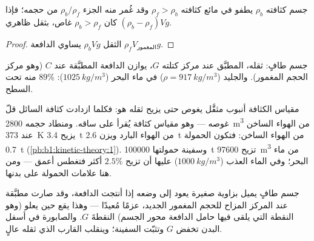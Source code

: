 \begin{corollary}[الطفو]\label{cor:b1:fluid-statics:floating}
جسم كثافته $\rho_b$ يطفو في مائع كثافته $\rho_f > \rho_b$ وقد غُمر
منه الجزء $\rho_b/\rho_f$ من حجمه؛ فإذا كان $\rho_b >
\rho_f$ غاص، بثقل ظاهري $(\rho_b - \rho_f)Vg$.
\end{corollary}

\begin{proof}
الثقل $\rho_bVg$ يساوي الدافعة $\rho_fV_{\text{المغمور}}g$.
\end{proof}

\begin{omfigure}

{\small جسم طافٍ: ثقله، المطبَّق عند مركز كتلته $G$، يوازن
الدافعة المطبَّقة عند  $C$ (وهو مركز الحجم
المغمور). والجليد ($\rho = \qty{917}{kg/m^3}$) في ماء البحر
($\qty{1025}{kg/m^3}$): $89\%$ منه تحت السطح.}
\end{omfigure}

\begin{example}\label{ex:b1:fluid-statics:buoy}
مقياس الكثافة أنبوب مثقَّل يغوص حتى يزيح ثقله هو: فكلما
ازدادت كثافة السائل قلّ غوصه --- وهو مقياس كثافة يُقرأ على
ساقه. ومنطاد حجمه \qty{2800}{m^3} من الهواء الساخن عند
\qty{373}{K} يزيح \qty{3.4}{t} من الهواء البارد ويزن \qty{2.6}{t} من
الهواء الساخن: فتكون الحمولة \qty{0.7}{t} (\cref{pb:b1:kinetic-theory:1}).
وسفينة حمولتها \qty{100000}{t} تزيح \qty{97600}{m^3} من ماء البحر؛
وفي الماء العذب ($\qty{1000}{kg/m^3}$) عليها أن تزيح $2.5\%$ أكثر
فتغطس أعمق --- ومن هنا علامات الحمولة على بدنها.
\end{example}

\begin{remark}[الاستقرار]\label{rem:b1:fluid-statics:stability}
جسم طافٍ يميل بزاوية صغيرة يعود إلى وضعه إذا أنتجت الدافعة،
وقد صارت مطبَّقة عند المركز المزاح للحجم المغمور الجديد،
عزمًا مُعيدًا --- وهذا يقع حين يعلو \emph{} (وهو
النقطة التي يلقى فيها حامل الدافعة محور الجسم) النقطةَ $G$.
والصابورة في أسفل البدن تخفض $G$ وتثبّت السفينة؛ وينقلب
القارب الذي ثقله عالٍ.
\end{remark}

